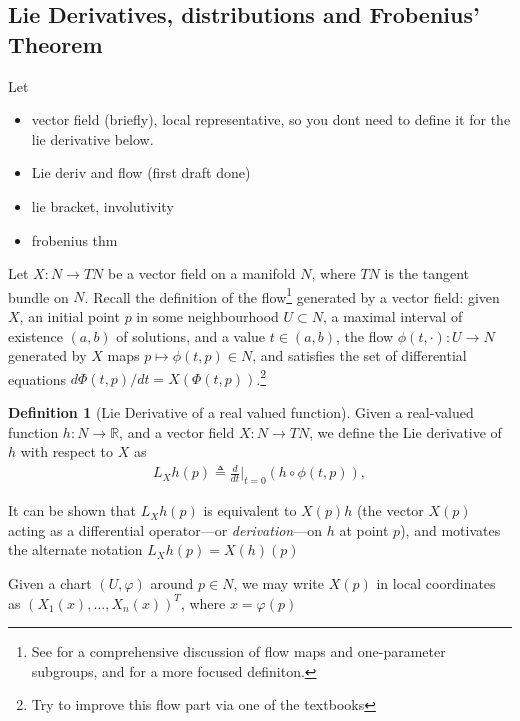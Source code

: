 \documentclass[psamsfonts]{amsart}
\theoremstyle{definition}
\newtheorem{defn}[thm]{Definition}
\theoremstyle{remark}
\newcommand*\R{\mathds{R}}
\numberwithin{equation}{section}
\begin{document}
\subsection{Lie Derivatives, distributions and Frobenius' Theorem}\label{sec:prelim-frobenius}

Let 


{\color{red}
\begin{itemize}
    \item vector field (briefly), local representative, so you dont need to define it for the lie derivative below. 
    \item Lie deriv and flow (first draft done)
    \item lie bracket, involutivity
    \item frobenius thm
\end{itemize}}

Let $X: N \rightarrow TN$ be a vector field on a manifold $N$, where $TN$ is the tangent bundle on $N$. Recall the definition of the flow\footnote{See \cite{boothby_2002} for a comprehensive discussion of flow maps and one-parameter subgroups, and \cite{nijmeijer_nonlinear_1990} for a more focused definiton.} generated by a vector field: given $X$, an initial point $p$ in some neighbourhood $U\subset N$, a maximal interval of existence $(a, b)$ of solutions, and a value $t\in (a,b)$, the flow $\phi(t, \cdot): U \rightarrow N$ generated by $X$ maps $p \mapsto \phi(t, p)\in N$, and satisfies the set of differential equations $d\Phi(t, p)/dt = X(\Phi(t, p))$.\footnote{{\color{red} Try to improve this flow part via one of the textbooks}}

\begin{defn}[Lie Derivative of a real valued function]
Given a real-valued function $h: N \rightarrow \R$, and a vector field $X: N\rightarrow TN$, we define the Lie derivative of $h$ with respect to $X$ as
\begin{align}
L_Xh(p) \triangleq \frac{d}{dt}\biggr|_{t=0}\left( h \circ \phi(t, p)  \right), 
\end{align}
\end{defn}
It can be shown that $L_Xh(p)$ is equivalent to $X(p)h$ (the vector $X(p)$ acting as a differential operator---or \textit{derivation}---on $h$ at point $p$), and motivates the alternate notation $L_Xh(p) = X(h)(p)$

Given a chart $(U, \varphi)$ around $p\in N$, we may write $X(p)$ in local coordinates as $(X_1(x), \dots, X_n(x))^T$, where $x = \varphi(p)$
\end{document}
